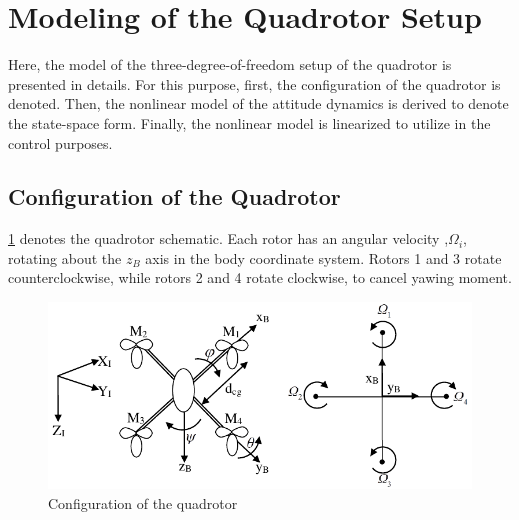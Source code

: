 \documentclass[conference]{IEEEtran}
\begin{document}
\section{Modeling of the Quadrotor  Setup}\label{sec:modeling}
\noindent Here, the model of the three-degree-of-freedom setup of the quadrotor is presented in details.
For this purpose, first, the configuration of the quadrotor is denoted. Then, the nonlinear model of the attitude dynamics is derived to denote the state-space form. Finally, the nonlinear model is linearized to utilize in the control purposes.
\subsection{Configuration of the Quadrotor}
\noindent  \figurename{\ref{QuadAssum}} denotes the quadrotor schematic.
Each rotor has an angular velocity ,$\Omega_i$, rotating about the $z_B$ axis in the body coordinate system.
Rotors 1 and 3 rotate counterclockwise, while rotors 2 and 4 rotate clockwise, to cancel yawing moment.
\vspace{-0.5cm}
\begin{figure}[!h]
	\includegraphics[width=\linewidth]{../Figures/introduction/fig17.pdf}
	\centering
	\caption{Configuration of the quadrotor}
	\label{QuadAssum}
\end{figure}
\end{document}
